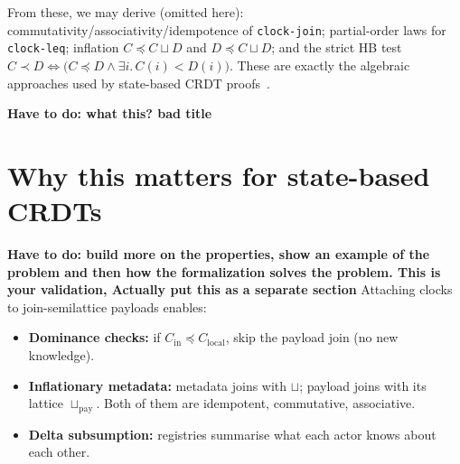 From these, we may derive (omitted here): commutativity/associativity/idempotence of \texttt{clock-join}; partial-order laws for \texttt{clock-leq}; inflation $C\preceq C\sqcup D$ and $D\preceq C\sqcup D$; and the strict HB test $C\prec D \Leftrightarrow \big(C\preceq D \wedge \exists i.\,C(i)<D(i)\big)$. These are exactly the algebraic approaches used by state-based CRDT proofs~\cite{shapiro2011conflict}.

\textbf{Have to do: what this? bad title}
\section{Why this matters for state-based CRDTs}\label{sec:vc-crdts}

\textbf{Have to do: build more on the properties, show an example of the problem and then how the formalization solves the problem. This is your validation, Actually put this as a separate section}
Attaching clocks to join-semilattice payloads enables:
\begin{itemize}
  \item \textbf{Dominance checks:} if $C_{\text{in}}\preceq C_{\text{local}}$, skip the payload join (no new knowledge).
  \item \textbf{Inflationary metadata:} metadata joins with $\sqcup$; payload joins with its lattice $\sqcup_{\text{pay}}$. Both of them are idempotent, commutative, associative.
  \item \textbf{Delta subsumption:} registries summarise what each actor knows about each other.
\end{itemize}

\endinput